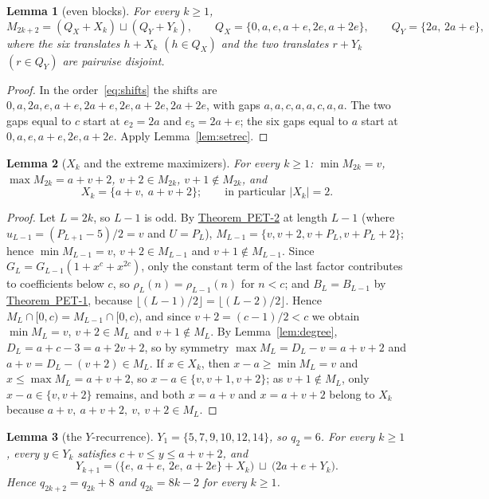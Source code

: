 \documentclass[11pt]{amsart}
\newtheorem{lemma}{Lemma}[section]
\theoremstyle{definition}
\theoremstyle{remark}
\theoremstyle{plain}
\numberwithin{equation}{section}
\newcommand{\floor}[1]{\lfloor #1\rfloor}
\newcommand{\PETone}{\hyperref[thm:pet1]{Theorem~PET-1}}
\newcommand{\PETtwo}{\hyperref[thm:pet2]{Theorem~PET-2}}
\begin{document}
\begin{lemma}[even blocks]\label{lem:blocks}
For every $k\ge1$,
\[
M_{2k+2}=(Q_X+X_k)\sqcup(Q_Y+Y_k),\qquad Q_X=\{0,a,e,a+e,2e,a+2e\},\qquad Q_Y=\{2a,\,2a+e\},
\]
where the six translates $h+X_k$ $(h\in Q_X)$ and the two translates $r+Y_k$ $(r\in Q_Y)$ are
pairwise disjoint.
\end{lemma}

\begin{proof}
In the order~\eqref{eq:shifts} the shifts are $0,a,2a,e,a+e,2a+e,2e,a+2e,2a+2e$, with gaps
$a,a,c,a,a,c,a,a$. The two gaps equal to $c$ start at $e_2=2a$ and $e_5=2a+e$; the six gaps equal to
$a$ start at $0,a,e,a+e,2e,a+2e$. Apply Lemma~\ref{lem:setrec}.
\end{proof}

\begin{lemma}[$X_k$ and the extreme maximizers]\label{lem:X}
For every $k\ge1$: $\min M_{2k}=v$, $\max M_{2k}=a+v+2$, $v+2\in M_{2k}$, $v+1\notin M_{2k}$,
and
\[
X_k=\{a+v,\ a+v+2\};\qquad\text{in particular }|X_k|=2.
\]
\end{lemma}

\begin{proof}
Let $L=2k$, so $L-1$ is odd. By \PETtwo{} at length $L-1$ (where
$u_{L-1}=(P_{L+1}-5)/2=v$ and $U=P_L$), $M_{L-1}=\{v,v+2,v+P_L,v+P_L+2\}$; hence
$\min M_{L-1}=v$, $v+2\in M_{L-1}$ and $v+1\notin M_{L-1}$. Since $G_L=G_{L-1}(1+x^c+x^{2c})$, only
the constant term of the last factor contributes to coefficients below $c$, so
$\rho_L(n)=\rho_{L-1}(n)$ for $n<c$; and $B_L=B_{L-1}$ by \PETone, because
$\floor{(L-1)/2}=\floor{(L-2)/2}$. Hence $M_L\cap[0,c)=M_{L-1}\cap[0,c)$, and since $v+2=(c-1)/2<c$
we obtain $\min M_L=v$, $v+2\in M_L$ and $v+1\notin M_L$. By Lemma~\ref{lem:degree},
$D_L=a+c-3=a+2v+2$, so by symmetry $\max M_L=D_L-v=a+v+2$ and $a+v=D_L-(v+2)\in M_L$.
If $x\in X_k$, then $x-a\ge\min M_L=v$ and $x\le\max M_L=a+v+2$, so $x-a\in\{v,v+1,v+2\}$; as
$v+1\notin M_L$, only $x-a\in\{v,v+2\}$ remains, and both $x=a+v$ and $x=a+v+2$ belong to $X_k$
because $a+v,\ a+v+2,\ v,\ v+2\in M_L$.
\end{proof}

\begin{lemma}[the $Y$-recurrence]\label{lem:Y}
$Y_1=\{5,7,9,10,12,14\}$, so $q_2=6$. For every $k\ge1$, every $y\in Y_k$ satisfies
$c+v\le y\le a+v+2$, and
\[
Y_{k+1}=\bigl(\{e,\,a+e,\,2e,\,a+2e\}+X_k\bigr)\ \sqcup\ \bigl(2a+e+Y_k\bigr).
\]
Hence $q_{2k+2}=q_{2k}+8$ and $q_{2k}=8k-2$ for every $k\ge1$.
\end{lemma}
\end{document}
